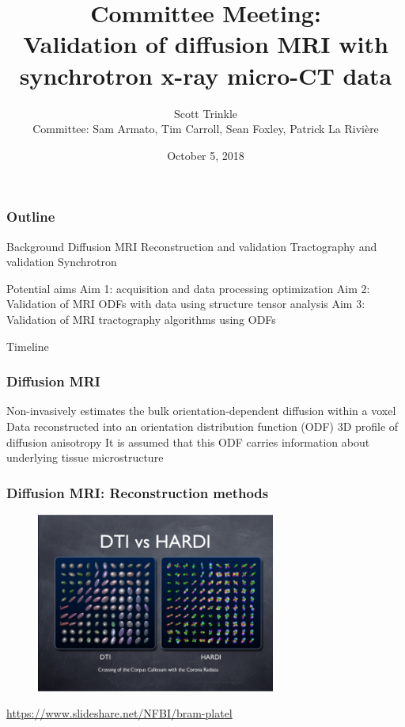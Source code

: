 \documentclass[presentation, 10pt]{beamer}
\author{Scott Trinkle\newline \\
  Committee: Sam Armato, Tim Carroll, Sean Foxley, Patrick La Rivi\`ere}
\date{October 5, 2018}
\title{Committee Meeting: \\Validation of diffusion MRI
  with synchrotron x-ray micro-CT data}
\begin{document}
\frame{\titlepage}

\begin{frame}
  \frametitle{Outline}
  \begin{outline}
    \1 Background
    \2 Diffusion MRI
    \3 Reconstruction and validation
    \3 Tractography and validation
    \2 Synchrotron \uct
    
    \1 Potential aims
    \2 Aim 1: \uct acquisition and data processing optimization 
    \2 Aim 2: Validation of MRI ODFs with \uct data using structure tensor analysis
    \2 Aim 3: Validation of MRI tractography algorithms using \uct ODFs

    \1 Timeline
  \end{outline}
\end{frame}

\begin{frame}
  \frametitle{Diffusion MRI}
  \begin{outline}
    \1 Non-invasively estimates the bulk orientation-dependent diffusion within a voxel
    \1 Data reconstructed into an orientation distribution function (ODF)
    \2 3D profile of diffusion anisotropy
    \1 It is assumed that this ODF carries information about underlying tissue microstructure
  \end{outline}
\end{frame}

\begin{frame}
  \frametitle{Diffusion MRI: Reconstruction methods}
  \begin{figure}[h]
    \centering
    \includegraphics[width=0.7\textwidth]{figs/dtihardi}
    \label{fig:dtivshardi}
  \end{figure}
  \begin{center}
    \tiny{\href{https://www.slideshare.net/NFBI/bram-platel}{https://www.slideshare.net/NFBI/bram-platel}}
  \end{center}
\end{frame}
\end{document}
